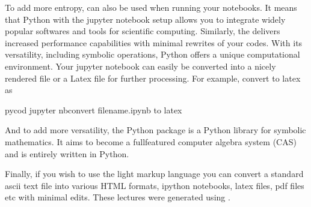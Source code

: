 \documentclass[letterpaper,10pt,english]{sphinxmanual}
\begin{document}
To add more entropy,  can also be used when running your
notebooks. It means that Python with the jupyter notebook
setup allows you to integrate widely popular softwares and tools for
scientific computing. Similarly, the
 delivers increased performance
capabilities with minimal rewrites of your codes.  With its
versatility, including symbolic operations, Python offers a unique
computational environment. Your jupyter notebook can easily be
converted into a nicely rendered  file or a Latex file for
further processing. For example, convert to latex as

\begin{sphinxVerbatim}[commandchars=\\\{\}]
    pycod jupyter nbconvert filename.ipynb \PYGZhy{}\PYGZhy{}to latex 
\end{sphinxVerbatim}

And to add more versatility, the Python package  is a Python library for symbolic mathematics. It aims to become a full\sphinxhyphen{}featured computer algebra system (CAS)  and is entirely written in Python.

Finally, if you wish to use the light mark\sphinxhyphen{}up language
 you can convert a standard ascii text file into various HTML
formats, ipython notebooks, latex files, pdf files etc with minimal edits. These lectures were generated using .
\end{document}
